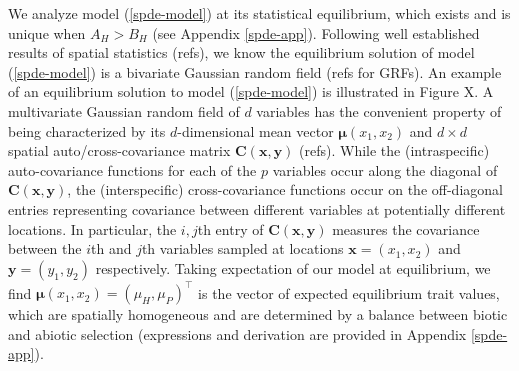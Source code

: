 \documentclass{article}
\begin{document}
We analyze model (\ref{spde-model}) at its statistical equilibrium,
which exists and is unique when \(A_H>B_H\) (see Appendix
\ref{spde-app}). Following well established results of spatial
statistics (refs), we know the equilibrium solution of model
(\ref{spde-model}) is a bivariate Gaussian random field (refs for GRFs).
An example of an equilibrium solution to model (\ref{spde-model}) is
illustrated in Figure X. A multivariate Gaussian random field of \(d\)
variables has the convenient property of being characterized by its
\(d\)-dimensional mean vector \(\pmb \mu(x_1,x_2)\) and \(d\times d\)
spatial auto/cross-covariance matrix \(\pmb C(\pmb x,\pmb y)\) (refs).
While the (intraspecific) auto-covariance functions for each of the
\(p\) variables occur along the diagonal of \(\pmb C(\pmb x,\pmb y)\),
the (interspecific) cross-covariance functions occur on the off-diagonal
entries representing covariance between different variables at
potentially different locations. In particular, the \(i,j\)th entry of
\(\pmb C(\pmb x,\pmb y)\) measures the covariance between the \(i\)th
and \(j\)th variables sampled at locations \(\pmb x=(x_1,x_2)\) and
\(\pmb y=(y_1,y_2)\) respectively. Taking expectation of our model at
equilibrium, we find \(\pmb\mu(x_1,x_2)=(\mu_H,\mu_P)^\top\) is the
vector of expected equilibrium trait values, which are spatially
homogeneous and are determined by a balance between biotic and abiotic
selection (expressions and derivation are provided in Appendix
\ref{spde-app}).
\end{document}
